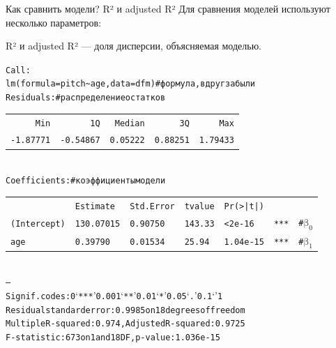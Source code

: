 \begin{frame}{Как сравнить модели? R² и adjusted R²}
Для сравнения моделей используют несколько параметров:
\begin{itemize}
\mytem R² и adjusted R² — доля дисперсии, объясняемая моделью.
\end{itemize}
\scriptsize
\begin{alltt}
Call:\\
lm(formula = pitch \textasciitilde  age, data = dfm)\hfill \# формула, вдруг забыли \bigskip\\
Residuals: \hfill \# распределение остатков\\
\begin{tabular}{rrrrr}
Min & 1Q & Median &3Q & Max \\
-1.87771 & -0.54867 & 0.05222 & 0.88251 & 1.79433 \\
\end{tabular}
\bigskip\\
Coefficients:\hfill \# коэффициенты модели\\
\begin{tabular}{llllllr}
					 	& Estimate		& Std. Error	& t value	&Pr(>|t|)	&  		& \\
(Intercept)		& 130.07015	&   0.90750		&  143.33		& < 2e-16 	& *** 	& \# $\mbox{β}_0$\\
age   				& 0.39790		& 0.01534		& 25.94		& 1.04e-15	&***	&  \# $\mbox{β}_1$\\
\end{tabular}
\\
---\\
Signif. codes:  0 ‘***’ 0.001 ‘**’ 0.01 ‘*’ 0.05 ‘.’ 0.1 ‘ ’ 1\medskip\\
Residual standard error: 0.9985 on 18 degrees of freedom\\
\alert{Multiple R-squared:  0.974,	Adjusted R-squared:  0.9725} \\
F-statistic:   673 on 1 and 18 DF,  p-value: 1.036e-15\\
\end{alltt}
\normalsize
\end{frame}

